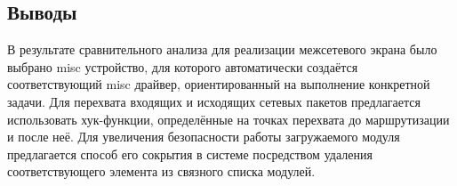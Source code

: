 \subsection*{Выводы}
В результате сравнительного анализа для реализации межсетевого экрана было выбрано misc устройство, для которого автоматически создаётся соответствующий misc драйвер, ориентированный на выполнение конкретной задачи. Для перехвата входящих и исходящих сетевых пакетов предлагается использовать хук-функции, определённые на точках перехвата до маршрутизации и после неё. Для увеличения безопасности работы загружаемого модуля предлагается способ его сокрытия в системе посредством удаления соответствующего элемента из связного списка модулей.



 